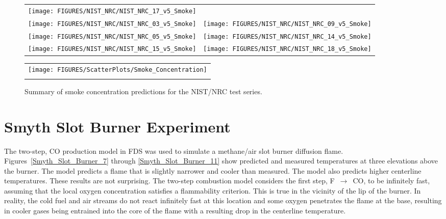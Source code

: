 \begin{figure}[p]
\begin{tabular*}{\textwidth}{l@{\extracolsep{\fill}}r}
\texttt{[image: FIGURES/NIST\_NRC/NIST\_NRC\_17\_v5\_Smoke]} &
 \\
\texttt{[image: FIGURES/NIST\_NRC/NIST\_NRC\_03\_v5\_Smoke]} &
\texttt{[image: FIGURES/NIST\_NRC/NIST\_NRC\_09\_v5\_Smoke]} \\
\texttt{[image: FIGURES/NIST\_NRC/NIST\_NRC\_05\_v5\_Smoke]} &
\texttt{[image: FIGURES/NIST\_NRC/NIST\_NRC\_14\_v5\_Smoke]} \\
\texttt{[image: FIGURES/NIST\_NRC/NIST\_NRC\_15\_v5\_Smoke]} &
\texttt{[image: FIGURES/NIST\_NRC/NIST\_NRC\_18\_v5\_Smoke]}
\end{tabular*}
\end{figure}



\begin{figure}[p]
\begin{center}
\begin{tabular}{c}
\texttt{[image: FIGURES/ScatterPlots/Smoke\_Concentration]} \\
\vspace{0.25in} \\
\end{tabular}
\end{center}
\caption{Summary of smoke concentration predictions for the NIST/NRC test series.}
\end{figure}



\clearpage

\section{Smyth Slot Burner Experiment}

The two-step, CO production model in FDS was used to simulate a methane/air slot burner diffusion flame.
Figures~\ref{Smyth_Slot_Burner_7} through \ref{Smyth_Slot_Burner_11}
show predicted and measured temperatures at three elevations above the burner.  The model predicts a flame that is slightly narrower
and cooler than measured.  The model
also predicts higher centerline temperatures.  These results are not surprising.  The two-step combustion model considers
the first step, F~$\longrightarrow$~CO, to be infinitely fast, assuming that the local oxygen concentration satisfies a
flammability criterion.  This is true in the vicinity of the lip of the burner.  In reality, the cold fuel and air
streams do not react infinitely fast at this location and some oxygen penetrates the flame at the base, resulting in cooler
gases being entrained into the core of the flame with a resulting drop in the centerline temperature.

